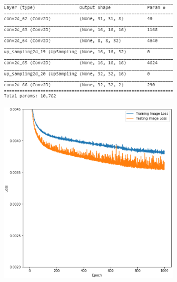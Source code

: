 \documentclass{l4proj}
\begin{document}
\begin{appendices}
\begin{figure}[h]
    \label{fig:augmentation_futher_testing} 
\end{figure}

\begin{figure}[h]
    \centering
    \begin{subfigure}[b]{0.5\textwidth}
        \includegraphics[width=\textwidth]{images/ShallowModel.PNG}
        \caption{}
    \end{subfigure}
    \quad
    \begin{subfigure}[b]{0.41\textwidth}
        \includegraphics[width=\textwidth]{images/LowCapacityLoss.PNG}
        \caption{}
    \end{subfigure} 

\end{figure}
\end{appendices}
\end{document}
